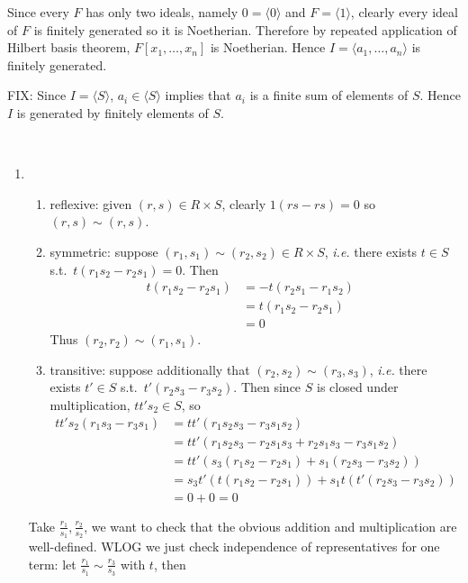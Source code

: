 \documentclass[12pt,class=article,crop=false]{standalone}
\begin{document}
\begin{problem}[1]
Since every $ F$ has only two ideals, namely $ 0 = \langle 0 \rangle$ and  $ F = \langle 1 \rangle$, clearly every ideal of $ F$ is finitely generated so it is Noetherian. Therefore by repeated application of Hilbert basis theorem, $ F[x_1,\ldots,x_n]$ is Noetherian. Hence $ I = \langle a_1,\ldots,a_n \rangle$ is finitely generated.

FIX:
Since $ I = \langle S \rangle$, $ a_i \in \langle S \rangle$ implies that $ a_i$ is a finite sum of elements of $ S$. Hence  $ I$ is generated by finitely elements of  $ S$.
\end{problem}
\begin{problem}[2]
~\begin{enumerate}[label=(\alph*)]
	\item 
		\begin{enumerate}[label=(\roman*)]
			\item reflexive: given $ (r,s) \in R \times S$, clearly $ 1(rs-rs) = 0$ so $ (r,s) \sim (r,s)$.
			\item symmetric: suppose $ (r_1,s_1) \sim (r_2,s_2) \in R \times S$, \emph{i.e.} there exists $ t \in S$ s.t.\  $t(r_1s_2-r_2s_1) =0$. Then
				\begin{align*}
					t(r_1s_2-r_2s_1) &=-t(r_2s_1 - r_1s_2) & \\
							 &=t(r_1s_2 - r_2 s_1)\\ 
							 &= 0 
				\end{align*}
				Thus $ (r_2,r_2) \sim (r_1,s_1)$.
			\item transitive: suppose additionally that $ (r_2,s_2) \sim (r_3,s_3)$, \emph{i.e.} there exists $ t' \in S$ s.t.\ $ t'(r_2s_3-r_3s_2)$. Then since $ S$ is closed under multiplication, $ tt's_2 \in S$, so
				\begin{align*}
					tt's_2(r_1s_3 - r_3s_1) &= tt'(r_1s_2s_3-r_3s_1s_2) \\
					&= tt'(r_1s_2s_3 - r_2s_1s_3 + r_2 s_1 s_3 -r_3s_1s_2)  \\
					&= tt'(s_3(r_1s_2 - r_2s_1) + s_1(r_2s_3-r_3s_2)) \\
					&= s_3t'(t(r_1s_2-r_2s_1)) + s_1t(t'(r_2s_3-r_3s_2))\\
					&= 0+0 = 0
				\end{align*}
		\end{enumerate}
		Take $ \frac{r_1}{s_1}, \frac{r_2}{s_2}$, we want to check that the obvious addition and multiplication are well-defined. WLOG we just check independence of representatives for one term: let $ \frac{r_1}{s_1} \sim \frac{r_3}{s_3}$ with $ t$, then

\end{enumerate}
\end{problem}
\end{document}
